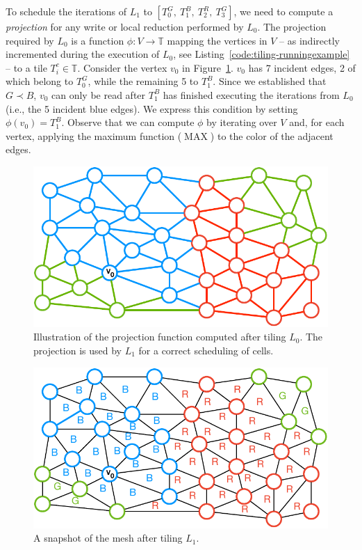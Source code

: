 To schedule the iterations of $L_1$ to $[T_0^G,\ T_1^B,\ T_2^R,\ T_3^G]$, we need to compute a \textit{projection} for any write or local reduction performed by $L_0$. The projection required by $L_0$ is a function $\phi : V \rightarrow \mathbb{T}$ mapping the vertices in $V$ -- as indirectly incremented during the execution of $L_0$, see Listing~\ref{code:tiling-runningexample} -- to a tile $T_i^c \in \mathbb{T}$. Consider the vertex $v_0$ in Figure~\ref{fig:st-loop-0-proj}. $v_0$ has 7 incident edges, 2 of which belong to $T_0^G$, while the remaining 5 to $T_1^B$. Since we established that $G \prec B$, $v_0$ can only be read after $T_1^B$ has finished executing the iterations from $L_0$ (i.e., the 5 incident blue edges). We express this condition by setting $\phi(v_0) = T_1^B$. Observe that we can compute $\phi$ by iterating over $V$ and, for each vertex, applying the maximum function ($\operatorname{MAX}$) to the color of the adjacent edges. 

\begin{figure}
\centering
\includegraphics[scale=0.6]{sparsetiling/figures/loop_0_with_vertices.pdf}
\caption{Illustration of the projection function computed after tiling $L_0$. The projection is used by $L_1$ for a correct scheduling of cells.}
\label{fig:st-loop-0-proj}
\end{figure}

\begin{figure}
\centering
\includegraphics[scale=0.6]{sparsetiling/figures/loop_1.pdf}
\caption{A snapshot of the mesh after tiling $L_1$.}
\label{fig:st-loop-1}
\end{figure}

